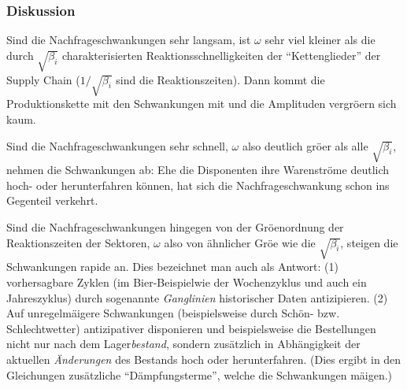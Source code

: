 \subsubsection*{Diskussion}
\bi
\item Sind die Nachfrageschwankungen sehr langsam, ist $\omega$ sehr
viel kleiner  als die durch $\sqrt{\beta_i}$ charakterisierten
Reaktionsschnelligkeiten der ``Kettenglieder'' der Supply Chain
($1/\sqrt{\beta_i}$ sind die Reaktionszeiten). Dann kommt
die Produktionskette mit den Schwankungen mit und die Amplituden
vergr\"o\3ern sich kaum.
\item Sind die Nachfrageschwankungen sehr schnell,  $\omega$ also
deutlich gr\"o\3er als alle $\sqrt{\beta_i}$, nehmen die Schwankungen
ab: Ehe die Disponenten ihre Warenstr\"ome deutlich hoch- oder
herunterfahren k\"onnen, hat sich die Nachfrageschwankung schon ins
Gegenteil verkehrt.
\item  Sind die Nachfrageschwankungen hingegen von der
Gr\"o\3enordnung der Reaktionszeiten der Sektoren, $\omega$ also von
\"ahnlicher Gr\"o\3e wie die $\sqrt{\beta_i}$, steigen die
Schwankungen rapide an. Dies bezeichnet man auch als
\ei
{}
{\scriptsize Antwort: (1) vorhersagbare Zyklen (im Bier-Beispielwie der Wochenzyklus und auch
 ein Jahreszyklus) durch
  sogenannte \emph{Ganglinien} historischer Daten antizipieren.
(2) Auf unregelm\"a\3igere Schwankungen (beispielsweise durch Sch\"on-
bzw. Schlechtwetter) antizipativer disponieren und beispielsweise die
Bestellungen nicht nur nach dem Lager\emph{bestand}, sondern zus\"atzlich
in Abh\"angigkeit der aktuellen \emph{\"Anderungen} des Bestands
hoch oder herunterfahren. (Dies ergibt in den Gleichungen zus\"atzliche
``D\"ampfungsterme'', welche die Schwankungen m\"a\3igen.)}
%
%
%
